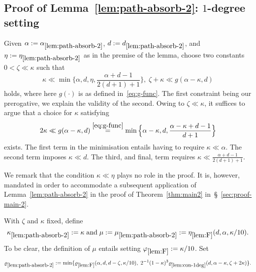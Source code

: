\documentclass[11pt,reqno]{amsart}
\def\absrefone{\mathrm{\ref{lem:path-absorb-2}}}
\def\Fref{\mathrm{\ref{lem:F}}}
\def\conrefone{\mathrm{\ref{lem:con-1deg}}}
\begin{document}
\subsection{Proof of Lemma~\ref{lem:path-absorb-2}: $1$-degree setting}\label{sec:proof-absorb-2}

%
Given $\alpha := \alpha_{\absrefone}$, $d := d_{\absrefone}$, and $\eta:=\eta_{\absrefone}$ as in the premise of the lemma, choose two constants  $0 <\zeta \ll \kappa$ such that 
\begin{equation}\label{eq:zeta-kappa}
\kappa \ll \min\bigg\{\alpha,d,\eta,\frac{\alpha + d -1 }{2(d+1)+1}\bigg\},\; \zeta + \kappa \ll g(\alpha-\kappa,d)
\end{equation}
holds, where here $g(\cdot)$ is as defined in~\eqref{eq:g-func}. 
The first constraint being our prerogative, we explain the validity of the second. Owing to $\zeta \ll \kappa$, it suffices to argue that a choice for $\kappa$ satisfying 
$$
2 \kappa \ll g(\alpha- \kappa,d) \overset{\eqref{eq:g-func}}{=} \min\Big\{\alpha -\kappa,d,\frac{\alpha -\kappa + d - 1}{d+1} \Big\}
$$ 
exists. The first term in the minimisation entails having to require $\kappa \ll \alpha$. The second term imposes $\kappa \ll d$. The third, and final, term requires
$
\kappa \ll \frac{\alpha + d -1 }{2(d+1)+1}
$.


We remark that the condition $\kappa \ll \eta$ plays no role in the proof. It is, however, mandated in order to accommodate a subsequent application of Lemma~\ref{lem:path-absorb-2} in the proof of Theorem~\ref{thm:main2} in~\S~\ref{sec:proof-main-2}. 

With $\zeta$ and $\kappa$ fixed, define 
$$
\kappa_{\absrefone}:= \kappa \mand \mu:=\mu_{\absrefone} := \eta_{\Fref}(d,\alpha,\kappa/10).
$$
To be clear, the definition of $\mu$ entails setting $\phi_{\Fref} := \kappa/10$. Set
\begin{equation}\label{eq:rho3-2}
\rho_{\absrefone} := \min\{\rho_{\Fref}(\alpha,d,d-\zeta,\kappa/10),\; 2^{-1}(1-\kappa)^3\rho_{\conrefone}(d,\alpha-\kappa,\zeta+2\kappa)\}.
\end{equation}
\end{document}
